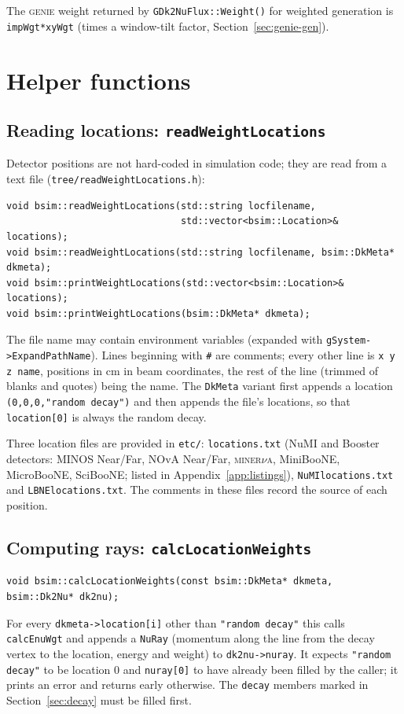 \documentclass[11pt]{article}
\newcommand{\code}[1]{\texttt{#1}}
\newcommand{\genie}{\textsc{genie}\xspace}
\newcommand{\sect}[1]{Section~\ref{sec:#1}}
\newcommand{\app}[1]{Appendix~\ref{app:#1}}
\begin{document}
\noindent The \genie weight returned by \code{GDk2NuFlux::Weight()} for
weighted generation is \code{impWgt*xyWgt} (times a window-tilt factor,
\sect{genie-gen}).

\section{Helper functions}\label{sec:helpers}

\subsection{Reading locations: \code{readWeightLocations}}\label{sec:readloc}

Detector positions are not hard-coded in simulation code; they are read
from a text file (\code{tree/readWeightLocations.h}):
\begin{lstlisting}[style=cxx,numbers=none]
void bsim::readWeightLocations(std::string locfilename,
                               std::vector<bsim::Location>& locations);
void bsim::readWeightLocations(std::string locfilename, bsim::DkMeta* dkmeta);
void bsim::printWeightLocations(std::vector<bsim::Location>& locations);
void bsim::printWeightLocations(bsim::DkMeta* dkmeta);
\end{lstlisting}
The file name may contain environment variables (expanded with
\code{gSystem->ExpandPathName}).  Lines beginning with \code{\#} are
comments; every other line is \code{x y z name}, positions in cm in beam
coordinates, the rest of the line (trimmed of blanks and quotes) being the
name.  The \code{DkMeta} variant first appends a location
\code{(0,0,0,"random decay")} and then appends the file's locations, so
that \code{location[0]} is always the random decay.

Three location files are provided in \code{etc/}:
\code{locations.txt} (NuMI and Booster detectors: MINOS Near/Far, NOvA
Near/Far, \textsc{miner}$\nu$\textsc{a}, MiniBooNE, MicroBooNE, SciBooNE;
listed in \app{listings}), \code{NuMIlocations.txt} and
\code{LBNElocations.txt}.  The comments in these files record the source
of each position.

\subsection{Computing rays: \code{calcLocationWeights}}

\begin{lstlisting}[style=cxx,numbers=none]
void bsim::calcLocationWeights(const bsim::DkMeta* dkmeta, bsim::Dk2Nu* dk2nu);
\end{lstlisting}
For every \code{dkmeta->location[i]} other than \code{"random decay"} this
calls \code{calcEnuWgt} and appends a \code{NuRay} (momentum along the
line from the decay vertex to the location, energy and weight) to
\code{dk2nu->nuray}.  It expects \code{"random decay"} to be location 0 and
\code{nuray[0]} to have already been filled by the caller; it prints an
error and returns early otherwise.  The \code{decay} members marked \dag{}
in \sect{decay} must be filled first.
\end{document}
